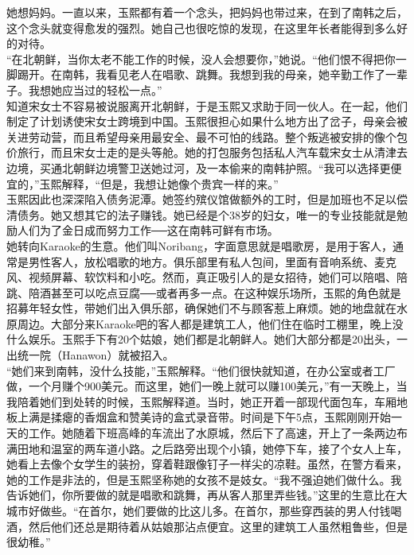 她想妈妈。一直以来，玉熙都有着一个念头，把妈妈也带过来，在到了南韩之后，这个念头就变得愈发的强烈。她自己也很吃惊的发现，在这里年长者能得到多么好的对待。\\

“在北朝鲜，当你太老不能工作的时候，没人会想要你，”她说。“他们恨不得把你一脚踢开。在南韩，我看见老人在唱歌、跳舞。我想到我的母亲，她辛勤工作了一辈子。我想她应当过的轻松一点。”\\

知道宋女士不容易被说服离开北朝鲜，于是玉熙又求助于同一伙人。在一起，他们制定了计划诱使宋女士跨境到中国。玉熙很担心如果什么地方出了岔子，母亲会被关进劳动营，而且希望母亲用最安全、最不可怕的线路。整个叛逃被安排的像个包价旅行，而且宋女士走的是头等舱。她的打包服务包括私人汽车载宋女士从清津去边境，买通北朝鲜边境警卫送她过河，及一本偷来的南韩护照。“我可以选择更便宜的，”玉熙解释，“但是，我想让她像个贵宾一样的来。”\\

玉熙因此也深深陷入债务泥潭。她签约殡仪馆做额外的工时，但是加班也不足以偿清债务。她又想其它的法子赚钱。她已经是个38岁的妇女，唯一的专业技能就是勉励人们为了金日成而努力工作──这在南韩可鲜有市场。\\

她转向Karaoke的生意。他们叫Noribang，字面意思就是唱歌房，是用于客人，通常是男性客人，放松唱歌的地方。俱乐部里有私人包间，里面有音响系统、麦克风、视频屏幕、软饮料和小吃。然而，真正吸引人的是女招待，她们可以陪唱、陪跳、陪酒甚至可以吃点豆腐──或者再多一点。在这种娱乐场所，玉熙的角色就是招募年轻女性，带她们出入俱乐部，确保她们不与顾客惹上麻烦。她的地盘就在水原周边。大部分来Karaoke吧的客人都是建筑工人，他们住在临时工棚里，晚上没什么娱乐。玉熙手下有20个姑娘，她们都是北朝鲜人。她们大部分都是20出头，一出统一院（Hanawon）就被招入。\\

“她们来到南韩，没什么技能，”玉熙解释。“他们很快就知道，在办公室或者工厂做，一个月赚个900美元。而这里，她们一晚上就可以赚100美元，”有一天晚上，当我陪着她们到处转的时候，玉熙解释道。当时，她正开着一部现代面包车，车厢地板上满是揉瘪的香烟盒和赞美诗的盒式录音带。时间是下午5点，玉熙刚刚开始一天的工作。她随着下班高峰的车流出了水原城，然后下了高速，开上了一条两边布满田地和温室的两车道小路。之后路旁出现个小镇，她停下车，接了个女人上车，她看上去像个女学生的装扮，穿着鞋跟像钉子一样尖的凉鞋。虽然，在警方看来，她的工作是非法的，但是玉熙坚称她的女孩不是妓女。“我不强迫她们做什么。我告诉她们，你所要做的就是唱歌和跳舞，再从客人那里弄些钱。”这里的生意比在大城市好做些。“在首尔，她们要做的比这儿多。在首尔，那些穿西装的男人付钱喝酒，然后他们还总是期待着从姑娘那沾点便宜。这里的建筑工人虽然粗鲁些，但是很幼稚。”\\

